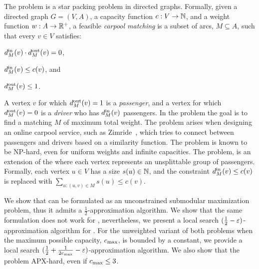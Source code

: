 
The \carpool problem is a star packing problem in directed graphs.
Formally, given a directed graph $G = (V, A)$, a capacity function $c:
V \rightarrow \N$, and a weight function $w: A \rightarrow \R^+$, a
feasible \emph{carpool matching} is a subset of arcs, $M \subseteq A$,
such that every $v \in V$ satisfies:%
\begin{inparaenum}[(i)]
\item $\din[M](v) \cdot \dout[M](v) = 0$,
\item $\din[M](v) \leq c(v)$, and 
\item $\dout[M](v) \leq 1$.
\end{inparaenum}
A vertex $v$ for which $\dout[M](v) = 1$ is a \emph{passenger}, and a
vertex for which $\dout[M](v) = 0$ is a \emph{driver} who has
$\din[M](v)$ passengers.  In the \carpool problem the goal is to find
a matching $M$ of maximum total weight.
%
The problem arises when designing an online carpool service, such as
Zimride~\cite{zimride}, which tries to connect between passengers and
drivers based on a similarity function.  The problem is known to be
NP-hard, even for uniform weights and infinite capacities.
%
The \gcp problem, is an extension of the \carpool where each vertex
represents an unsplittable group of passengers.  Formally, each vertex
$u \in V$ has a size $s(u) \in \N$, and the constraint $\din(v) \leq
c(v)$ is replaced with $\sum_{u:(u,v) \in M} s(u) \leq c(v)$.

We show that \carpool can be formulated as an unconstrained submodular
maximization problem, thus it admits a $\frac{1}{2}$-approximation
algorithm.  We show that the same formulation does not work for \gcp,
nevertheless, we present a local search $(\frac{1}{2}
- \eps)$-approximation algorithm for \gcp.
%
For the unweighted variant of both problems when the maximum possible
capacity, $\cmax$, is bounded by a constant, we provide a local search
$(\half + \inv{2\cmax} - \eps)$-approximation algorithm.  We also show
that the problem APX-hard, even if $\cmax \leq 3$.

